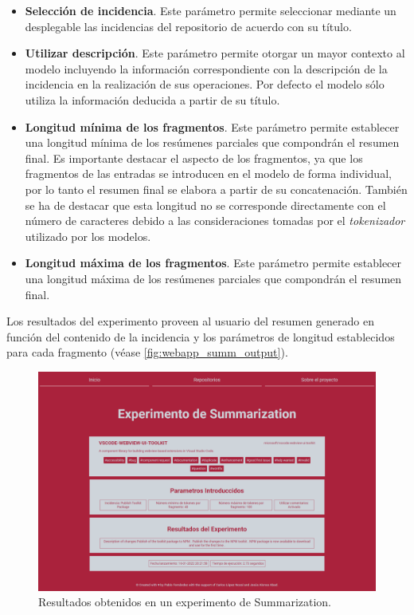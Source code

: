 \begin{itemize} \setlength\itemsep{0.2em}
    \item \textbf{Selección de incidencia}. Este parámetro permite seleccionar mediante un desplegable las incidencias del repositorio de acuerdo con su título.
    \item \textbf{Utilizar descripción}. Este parámetro permite otorgar un mayor contexto al modelo incluyendo la información correspondiente con la descripción de la incidencia en la realización de sus operaciones. Por defecto el modelo sólo utiliza la información deducida a partir de su título.
    \item \textbf{Longitud mínima de los fragmentos}. Este parámetro permite establecer una longitud mínima de los resúmenes parciales que compondrán el resumen final. Es importante destacar el aspecto de los fragmentos, ya que los fragmentos de las entradas se introducen en el modelo de forma individual, por lo tanto el resumen final se elabora a partir de su concatenación. También se ha de destacar que esta longitud no se corresponde directamente con el número de caracteres debido a las consideraciones tomadas por el \textit{tokenizador} utilizado por los modelos.
    \item \textbf{Longitud máxima de los fragmentos}. Este parámetro permite establecer una longitud máxima de los resúmenes parciales que compondrán el resumen final.
\end{itemize}

Los resultados del experimento proveen al usuario del resumen generado en función del contenido de la incidencia y los parámetros de longitud establecidos para cada fragmento (véase \autoref{fig:webapp_summ_output}).

\begin{figure}[!ht]
	\centering
    \includegraphics[width=\textwidth]{img/webapp_summ_output.png}
	\caption{Resultados obtenidos en un experimento de Summarization.}
	\label{fig:webapp_summ_output}
\end{figure}